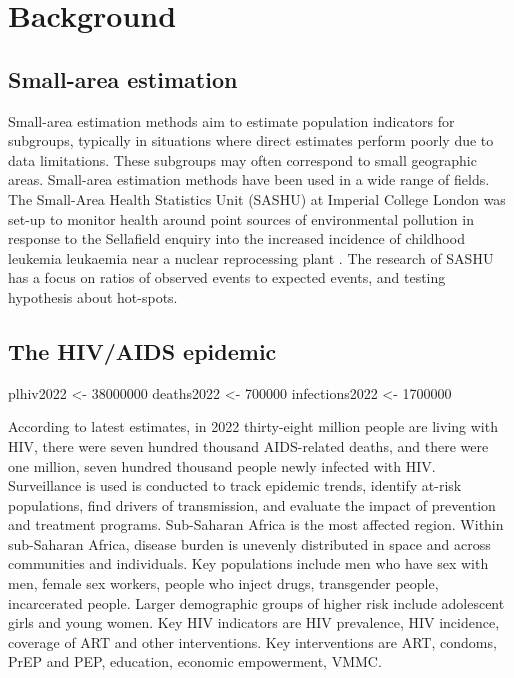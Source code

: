 \documentclass[a4paper, nobind]{templates/ociamthesis}
\newenvironment{Shaded}{\begin{snugshade}}{\end{snugshade}}
\newcommand{\DecValTok}[1]{\textcolor[rgb]{0.00,0.00,0.81}{#1}}
\newcommand{\NormalTok}[1]{#1}
\newcommand{\OtherTok}[1]{\textcolor[rgb]{0.56,0.35,0.01}{#1}}
\renewenvironment{Shaded}
{
  \vspace{10pt}%
  \begin{snugshade}%
}{%
  \end{snugshade}%
  \vspace{8pt}%
}
\begin{document}
\hypertarget{background}{%
\chapter{Background}\label{background}}

\adjustmtc
{}

\hypertarget{small-area-estimation}{%
\section{Small-area estimation}\label{small-area-estimation}}

Small-area estimation methods aim to estimate population indicators for subgroups, typically in situations where direct estimates perform poorly due to data limitations.
These subgroups may often correspond to small geographic areas.
Small-area estimation methods have been used in a wide range of fields.
The Small-Area Health Statistics Unit (SASHU) at Imperial College London was set-up to monitor health around point sources of environmental pollution in response to the Sellafield enquiry into the increased incidence of childhood leukemia leukaemia near a nuclear reprocessing plant \autocite{elliott1992small}.
The research of SASHU has a focus on ratios of observed events to expected events, and testing hypothesis about hot-spots.

\hypertarget{the-hivaids-epidemic}{%
\section{The HIV/AIDS epidemic}\label{the-hivaids-epidemic}}

\begin{Shaded}
\begin{Highlighting}[]
\NormalTok{plhiv2022 }\OtherTok{\textless{}{-}} \DecValTok{38000000}
\NormalTok{deaths2022 }\OtherTok{\textless{}{-}} \DecValTok{700000}
\NormalTok{infections2022 }\OtherTok{\textless{}{-}} \DecValTok{1700000}
\end{Highlighting}
\end{Shaded}

According to latest estimates, in 2022 thirty-eight million people are living with HIV, there were seven hundred thousand AIDS-related deaths, and there were one million, seven hundred thousand people newly infected with HIV.
Surveillance is used is conducted to track epidemic trends, identify at-risk populations, find drivers of transmission, and evaluate the impact of prevention and treatment programs.
Sub-Saharan Africa is the most affected region.
Within sub-Saharan Africa, disease burden is unevenly distributed in space and across communities and individuals.
Key populations include men who have sex with men, female sex workers, people who inject drugs, transgender people, incarcerated people.
Larger demographic groups of higher risk include adolescent girls and young women.
Key HIV indicators are HIV prevalence, HIV incidence, coverage of ART and other interventions.
Key interventions are ART, condoms, PrEP and PEP, education, economic empowerment, VMMC.
\end{document}
